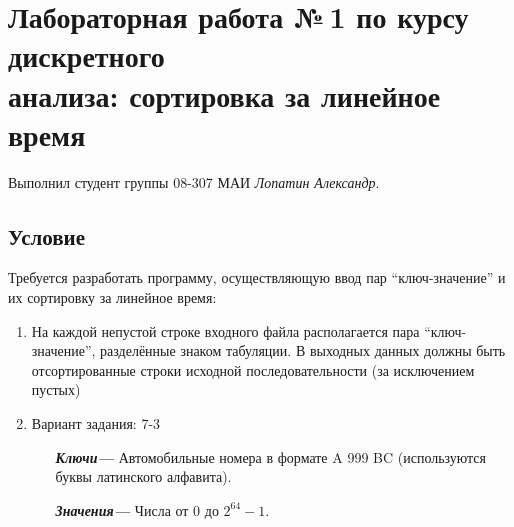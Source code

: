 \documentclass[12pt]{article}
\begin{document}
\section*{Лабораторная работа №\,1 по курсу дискретного\\ анализа: сортировка за линейное время}

Выполнил студент группы 08-307 МАИ \textit{Лопатин Александр}.
\subsection*{Условие}

Требуется разработать программу, осуществляющую ввод пар ``ключ-значение'' и их сортировку за линейное время: 
\begin{enumerate}
\item На каждой непустой строке входного файла располагается пара ``ключ-значение'', разделённые знаком табуляции. В выходных данных должны быть отсортированные строки исходной последовательности (за исключением пустых)
\item Вариант задания: 7-3
\begin{itemize}

 \item[\textbf{ \it Ключи---}] Автомобильные номера в формате A 999 BC (используются буквы латинского алфавита).
 \item[\textbf{ \it Значения---}] Числа от 0 до $2^{64} - 1$.

\end{itemize}
\end{enumerate}
\end{document}
